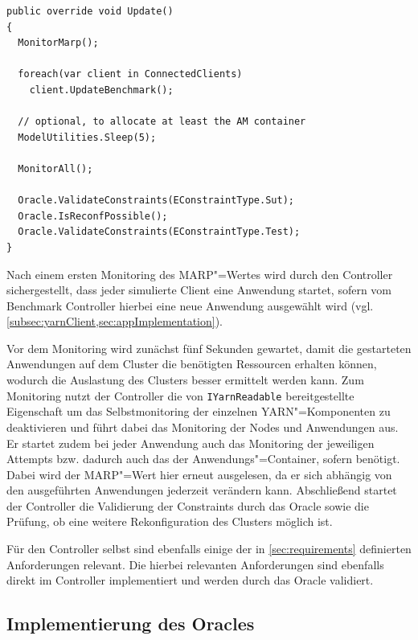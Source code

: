 \begin{lstlisting}[label=lst:controllerUpdate,style=cs,
caption={[Update()"=Methode des Controllers]
    \texttt{Update()}"=Methode des Controllers (gekürzt).
    Eine ausführliche Beschreibung des Ablaufs der Ausführung eines Testfalls findet sich in \cref{subsec:simulationStep}.}]
public override void Update()
{
  MonitorMarp();
  
  foreach(var client in ConnectedClients)
    client.UpdateBenchmark();
  
  // optional, to allocate at least the AM container
  ModelUtilities.Sleep(5);
  
  MonitorAll();
  
  Oracle.ValidateConstraints(EConstraintType.Sut);
  Oracle.IsReconfPossible();
  Oracle.ValidateConstraints(EConstraintType.Test);
}
\end{lstlisting}

Nach einem ersten Monitoring des \ac{MARP}"=Wertes wird durch den Controller sichergestellt, dass jeder simulierte Client eine Anwendung startet, sofern vom Benchmark Controller hierbei eine neue Anwendung ausgewählt wird (vgl. \cref{subsec:yarnClient,sec:appImplementation}).

Vor dem Monitoring wird zunächst fünf Sekunden gewartet, damit die gestarteten Anwendungen auf dem Cluster die benötigten Ressourcen erhalten können, wodurch die Auslastung des Clusters besser ermittelt werden kann.
Zum Monitoring nutzt der Controller die von \texttt{IYarnReadable} bereitgestellte Eigenschaft um das Selbstmonitoring der einzelnen \ac{YARN}"=Komponenten zu deaktivieren und führt dabei das Monitoring der Nodes und Anwendungen aus.
Er startet zudem bei jeder Anwendung auch das Monitoring der jeweiligen Attempts bzw. dadurch auch das der Anwendungs"=Container, sofern benötigt.
Dabei wird der \ac{MARP}"=Wert hier erneut ausgelesen, da er sich abhängig von den ausgeführten Anwendungen jederzeit verändern kann.
Abschließend startet der Controller die Validierung der Constraints durch das Oracle sowie die Prüfung, ob eine weitere Rekonfiguration des Clusters möglich ist.

Für den Controller selbst sind ebenfalls einige der in \cref{sec:requirements} definierten Anforderungen relevant.
Die hierbei relevanten Anforderungen sind ebenfalls direkt im Controller implementiert und werden durch das Oracle validiert.

\subsection{Implementierung des Oracles}
\label{subsec:oracleImpl}

